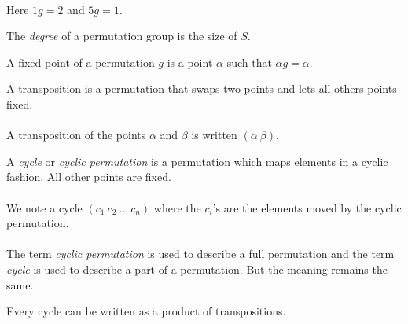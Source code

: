 \paragraph{}
Here $1g = 2$ and $5g = 1$.

\begin{definition}
  The \textit{degree} of a permutation group is the size of $S$.
\end{definition}

\begin{definition}
  A fixed point of a permutation $g$ is a point $\alpha$ such that $\alpha g = \alpha$.
\end{definition}

\begin{definition}[Transposition]
  A transposition is a permutation that swaps two points and lets all others points fixed.
\end{definition}

\paragraph{}
A transposition of the points $\alpha$ and $\beta$ is written $(\alpha\ \beta)$.

\begin{definition}[Cycle]
  A \textit{cycle} or \textit{cyclic permutation} is a permutation which maps elements in a cyclic fashion. All other points are fixed.
\end{definition}

\paragraph{}
We note a cycle $(c_1\ c_2\ \dots\ c_n)$ where the $c_i$'s are the elements moved by the cyclic permutation.

\paragraph{}
The term \textit{cyclic permutation} is used to describe a full permutation and the term \textit{cycle} is used to describe a part of a permutation. But the meaning remains the same.

\begin{proposition}
  Every cycle can be written as a product of transpositions.
\end{proposition}


